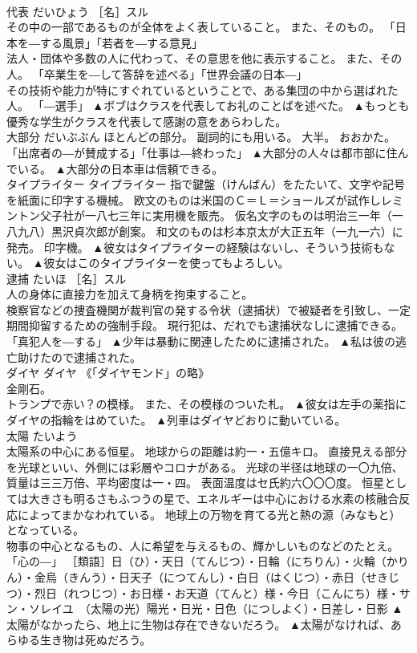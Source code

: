 \documentclass[8pt]{extreport}
\begin{document}
\begin{CJK}{UTF8}{min}
\\	代表	だいひょう	［名］スル 
\\	その中の一部であるものが全体をよく表していること。 また、そのもの。 「日本を―する風景」「若者を―する意見」 
\\	法人・団体や多数の人に代わって、その意思を他に表示すること。 また、その人。 「卒業生を―して答辞を述べる」「世界会議の日本―」 
\\	その技術や能力が特にすぐれているということで、ある集団の中から選ばれた人。 「―選手」	▲ボブはクラスを代表してお礼のことばを述べた。 ▲もっとも優秀な学生がクラスを代表して感謝の意をあらわした。
\\	大部分	だいぶぶん	ほとんどの部分。 副詞的にも用いる。 大半。 おおかた。 「出席者の―が賛成する」「仕事は―終わった」	▲大部分の人々は都市部に住んでいる。 ▲大部分の日本車は信頼できる。
\\	タイプライター	タイプライター	指で鍵盤（けんばん）をたたいて、文字や記号を紙面に印字する機械。 欧文のものは米国のＣ＝Ｌ＝ショールズが試作しレミントン父子社が一八七三年に実用機を販売。 仮名文字のものは明治三一年（一八九八）黒沢貞次郎が創案。 和文のものは杉本京太が大正五年（一九一六）に発売。 印字機。	▲彼女はタイプライターの経験はないし、そういう技術もない。 ▲彼女はこのタイプライターを使ってもよろしい。
\\	逮捕	たいほ	［名］スル 
\\	人の身体に直接力を加えて身柄を拘束すること。 
\\	検察官などの捜査機関が裁判官の発する令状（逮捕状）で被疑者を引致し、一定期間抑留するための強制手段。 現行犯は、だれでも逮捕状なしに逮捕できる。 「真犯人を―する」	▲少年は暴動に関連したために逮捕された。 ▲私は彼の逃亡助けたので逮捕された。
\\	ダイヤ	ダイヤ	《「ダイヤモンド」の略》 
\\	金剛石。 
\\	トランプで赤い？の模様。 また、その模様のついた札。	▲彼女は左手の薬指にダイヤの指輪をはめていた。 ▲列車はダイヤどおりに動いている。
\\	太陽	たいよう	
\\	太陽系の中心にある恒星。 地球からの距離は約一・五億キロ。 直接見える部分を光球といい、外側には彩層やコロナがある。 光球の半径は地球の一〇九倍、質量は三三万倍、平均密度は一・四。 表面温度はセ氏約六〇〇〇度。 恒星としては大きさも明るさもふつうの星で、エネルギーは中心における水素の核融合反応によってまかなわれている。 地球上の万物を育てる光と熱の源（みなもと）となっている。 
\\	物事の中心となるもの、人に希望を与えるもの、輝かしいものなどのたとえ。 「心の―」 ［類語］日（ひ）・天日（てんじつ）・日輪（にちりん）・火輪（かりん）・金烏（きんう）・日天子（につてんし）・白日（はくじつ）・赤日（せきじつ）・烈日（れつじつ）・お日様・お天道（てんと）様・今日（こんにち）様・サン・ソレイユ　（太陽の光）陽光・日光・日色（につしよく）・日差し・日影	▲太陽がなかったら、地上に生物は存在できないだろう。 ▲太陽がなければ、あらゆる生き物は死ぬだろう。

\end{CJK}
\end{document}

